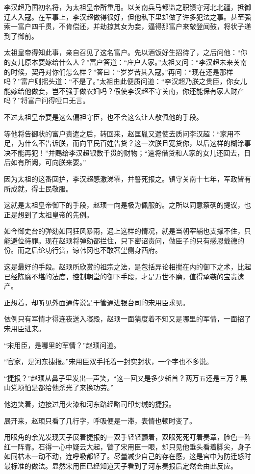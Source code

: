 李汉超乃国初名将，为太祖皇帝所重用。以关南兵马都监之职镇守河北北疆，抵御辽人入寇。在军事上，李汉超做得很好，但他私下里却做了许多犯法之事。甚至强索一富户四千贯，不肯偿还，并劫掠其女为妾，逼得那富户来敲登闻鼓，将状子递到了御前。

太祖皇帝得知此事，亲自召见了这名富户。先以酒饭好生招待了，之后问他：“你的女儿原本要嫁给什么人？”富户答道：“庄户人家。”太祖又问：“李汉超未来关南的时候，契丹对你们怎么样？”答曰：“岁岁苦其入寇。”再问：“现在还是那样吗？”富户则摇头道：“不是了。”太祖由此便质问道：“李汉超乃朕之贵臣，你女儿能嫁给他做妾，岂不强于做农妇吗？假使李汉超不守关南，你还能保有家人财产吗？”将富户问得哑口无言。

不过太祖皇帝要是这么偏袒守臣，也不会这么让人敬佩他的手段。

等他将告御状的富户责遣之后，转回来，赵匡胤又遣使去质问李汉超：“家用不足，为什么不告诉朕，而向平民百姓告贷？这一次朕且宽贷你，以后这样的糊涂事决不能再犯！”并赐给李汉超银数千贯的财物；“速将借贷和人家的女儿还回去，日后如有所阙，可向朕来要。”

因为太祖的这番回护，李汉超感激涕零，并誓死报之。镇守关南十七年，军政皆有所成就，得士民敬服。

这就是太祖皇帝御下的手段，赵顼一向是极为佩服的。之所以同意蔡确的提议，也正是想到了太祖皇帝的先例。

如今御史台的弹劾如同狂风暴雨，遇上这样的情况，就是当朝宰辅也支撑不住，只能避位待罪。现在赵顼将弹劾都拦住，只下密诏责问，做臣子的只有感恩戴德的份。而之后论功行赏，谅韩冈也不敢奢望侧身西府。

这是最好的手段。赵顼所欣赏的祖宗之法，是包括异论相搅在内的御下之术，比起已经陈腐不堪的法度，控制朝堂的御下手段，才是万世不磨，值得承袭的宝贵遗产。

正想着，却听见外面通传说是干管通进银台司的宋用臣求见。

依例只有军情才得连夜送入寝殿，赵顼一面猜度着不知又是哪里的军情，一面招了宋用臣进来。

“宋用臣，是哪里的军情？”赵顼问道。

“官家，是河东捷报。”宋用臣双手托着一封实封状，一个字也不多说。

“捷报？”赵顼从鼻子里发出一声笑，“这一回又是多少斩首？两万五还是三万？黑山党项怕是都给他杀光了来换功劳。”

他边笑着，边接过用火漆和河东路经略司印封缄的捷报。

展开来，赵顼只看了几行字，呼吸便是一滞，表情也顿时变了。

用眼角的余光发现天子展着捷报的一双手轻轻颤着，双眼死死盯着奏章，脸色一阵红一阵青。石得一心中疑云大起，瞥了宋用臣一眼，却只见他垂头看着脚尖，身子如同枯木一动不动，连呼吸都轻了。尽量减少自己的存在感，这是宫中为防迁怒时最标准的做法。显然宋用臣已经知道天子看到了河东奏报后定然会由此反应。

